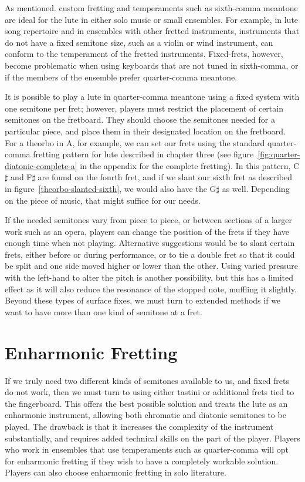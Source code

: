 As mentioned. custom fretting and temperaments such as sixth-comma meantone are ideal for the lute
in either solo music or small ensembles.  For example, in lute song repertoire and in ensembles with
other fretted instruments, instruments that do not have a fixed semitone size, such as a violin or
wind instrument, can conform to the temperament of the fretted instruments. Fixed-frets, however,
become problematic when using keyboards that are not tuned in sixth-comma, or if the members of the
ensemble prefer quarter-comma meantone.

It is possible to play a lute in quarter-comma meantone using a fixed system with one semitone per
fret; however, players must restrict the placement of certain semitones on the fretboard.  They
should choose the semitones needed for a particular piece, and place them in their designated
location on the fretboard.  For a theorbo in A, for example, we can set our frets using the standard
quarter-comma fretting pattern for lute described in chapter three 
(see figure~\ref{fig:quarter-diatonic-complete-a} in the appendix for the complete fretting).  
In this pattern, C$\sharp$ and F$\sharp$ are found on the fourth fret, and if we slant our sixth 
fret as described in figure~\ref{theorbo-slanted-sixth}, we would also have the G$\sharp$ as well. 
Depending on the piece of music, that might suffice for our needs.

If the needed semitones vary from piece to piece, or between sections of a larger work such as an
opera, players can change the position of the frets if they have enough time when not playing.
Alternative suggestions would be to slant certain frets, either before or during performance, or to
tie a double fret so that it could be split and one side moved higher or lower than the other. Using
varied pressure with the left-hand to alter the pitch is another possibility, but this has a limited
effect as it will also reduce the resonance of the stopped note, muffling it slightly. Beyond these
types of surface fixes, we must turn to extended methods if we want to have more than one kind of
semitone at a fret.

\section{Enharmonic Fretting}

If we truly need two different kinds of semitones available to us, and fixed frets
do not work, then we must turn to using either tastini or additional frets
tied to the fingerboard.  This offers the best possible solution and treats the lute as
an enharmonic instrument, allowing both chromatic and diatonic semitones to be
played. The drawback is that it increases the complexity of the instrument substantially,
and requires added technical skills on the part of the player. Players who work in
ensembles that use temperaments such as quarter-comma will opt for enharmonic fretting
if they wish to have a completely workable solution. Players can also choose
enharmonic fretting in solo literature.

